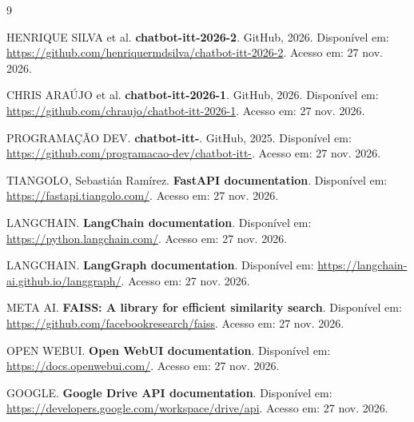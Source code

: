 \documentclass[12pt,a4paper]{article}
\begin{document}
{}
\begin{thebibliography}{9}

HENRIQUE SILVA et al.
\textbf{chatbot-itt-2026-2}.
GitHub, 2026.
Disponível em: \url{https://github.com/henriquermdsilva/chatbot-itt-2026-2}.
Acesso em: 27 nov. 2026.

CHRIS ARAÚJO et al.
\textbf{chatbot-itt-2026-1}.
GitHub, 2026.
Disponível em: \url{https://github.com/chraujo/chatbot-itt-2026-1}.
Acesso em: 27 nov. 2026.

PROGRAMAÇÃO DEV.
\textbf{chatbot-itt-}.
GitHub, 2025.
Disponível em: \url{https://github.com/programacao-dev/chatbot-itt-}.
Acesso em: 27 nov. 2026.

TIANGOLO, Sebastián Ramírez.
\textbf{FastAPI documentation}.
Disponível em: \url{https://fastapi.tiangolo.com/}.
Acesso em: 27 nov. 2026.

LANGCHAIN.
\textbf{LangChain documentation}.
Disponível em: \url{https://python.langchain.com/}.
Acesso em: 27 nov. 2026.

LANGCHAIN.
\textbf{LangGraph documentation}.
Disponível em: \url{https://langchain-ai.github.io/langgraph/}.
Acesso em: 27 nov. 2026.

META AI.
\textbf{FAISS: A library for efficient similarity search}.
Disponível em: \url{https://github.com/facebookresearch/faiss}.
Acesso em: 27 nov. 2026.

OPEN WEBUI.
\textbf{Open WebUI documentation}.
Disponível em: \url{https://docs.openwebui.com/}.
Acesso em: 27 nov. 2026.

GOOGLE.
\textbf{Google Drive API documentation}.
Disponível em: \url{https://developers.google.com/workspace/drive/api}.
Acesso em: 27 nov. 2026.

\end{thebibliography}

\end{document}

